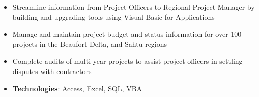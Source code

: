 \documentclass[10pt, letterpaper, ragged2e, withhyper]{altacv}
\begin{document}
\begin{paracol}{2}
            \begin{itemize}
                 \item Streamline information from Project Officers to Regional Project Manager by building and upgrading tools 
                 using Visual Basic for Applications
                \item Manage and maintain project budget and status information for over 100 projects in the Beaufort Delta, and Sahtu regions  
                \item Complete audits of multi-year projects to assist project officers in settling disputes with contractors 
                \item \textbf{Technologies}: Access, Excel, SQL, VBA 
            \end{itemize}

            

            

\end{paracol}
\end{document}
